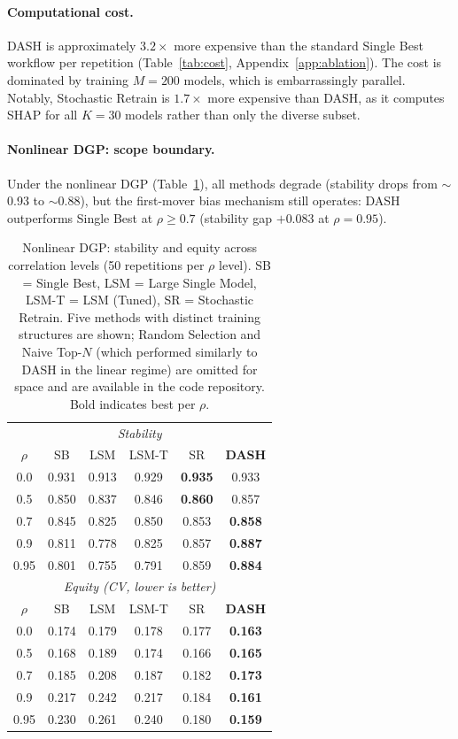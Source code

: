 \documentclass[11pt]{article}
\newcommand{\dash}{\textsc{DASH}}
\newcommand{\rhovar}{\rho}
\begin{document}
\paragraph{Computational cost.}
\dash{} is approximately $3.2\times$ more expensive than the standard
Single Best workflow per repetition (Table~\ref{tab:cost},
Appendix~\ref{app:ablation}). The cost is dominated by training
$M = 200$ models, which is embarrassingly parallel. Notably, Stochastic
Retrain is $1.7\times$ more expensive than \dash{}, as it computes SHAP
for all $K = 30$ models rather than only the diverse subset.

\paragraph{Nonlinear DGP: scope boundary.}
\label{sec:nonlinear}
Under the nonlinear DGP (Table~\ref{tab:nonlinear}), all methods
degrade (stability drops from $\sim$0.93 to $\sim$0.88), but the
first-mover bias mechanism still operates: \dash{} outperforms Single
Best at $\rhovar \geq 0.7$ (stability gap $+0.083$ at $\rhovar = 0.95$).

\begin{table}[htbp]
\centering
\caption{Nonlinear DGP: stability and equity across correlation levels
(50 repetitions per $\rhovar$ level).
SB = Single Best, LSM = Large Single Model, LSM-T = LSM (Tuned),
SR = Stochastic Retrain.
Five methods with distinct training structures are shown; Random Selection
and Naive Top-$N$ (which performed similarly to \dash{} in the linear regime)
are omitted for space and are available in the code repository.
Bold indicates best per $\rhovar$.}
\label{tab:nonlinear}
\begin{tabular}{cccccc}
\toprule
\multicolumn{6}{c}{\textit{Stability}} \\
$\rhovar$ & SB & LSM & LSM-T & SR & \textbf{DASH} \\
\midrule
0.0  & 0.931 & 0.913 & 0.929 & \textbf{0.935} & 0.933 \\
0.5  & 0.850 & 0.837 & 0.846 & \textbf{0.860} & 0.857 \\
0.7  & 0.845 & 0.825 & 0.850 & 0.853 & \textbf{0.858} \\
0.9  & 0.811 & 0.778 & 0.825 & 0.857 & \textbf{0.887} \\
0.95 & 0.801 & 0.755 & 0.791 & 0.859 & \textbf{0.884} \\
\midrule
\multicolumn{6}{c}{\textit{Equity (CV, lower is better)}} \\
$\rhovar$ & SB & LSM & LSM-T & SR & \textbf{DASH} \\
\midrule
0.0  & 0.174 & 0.179 & 0.178 & 0.177 & \textbf{0.163} \\
0.5  & 0.168 & 0.189 & 0.174 & 0.166 & \textbf{0.165} \\
0.7  & 0.185 & 0.208 & 0.187 & 0.182 & \textbf{0.173} \\
0.9  & 0.217 & 0.242 & 0.217 & 0.184 & \textbf{0.161} \\
0.95 & 0.230 & 0.261 & 0.240 & 0.180 & \textbf{0.159} \\
\bottomrule
\end{tabular}
\end{table}
\end{document}

